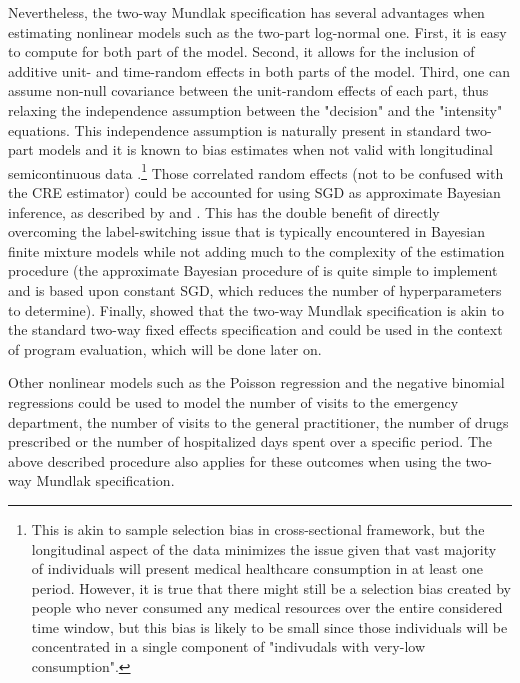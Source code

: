 \documentclass[11pt,letter]{article}
\begin{document}
Nevertheless, the two-way Mundlak specification has several advantages when estimating nonlinear models such as the two-part log-normal one. First, it is easy to compute for both part of the model. Second, it allows for the inclusion of additive unit- and time-random effects in both parts of the model. Third, one can assume non-null covariance between the unit-random effects of each part, thus relaxing the independence assumption between the "decision" and the "intensity" equations. This independence assumption is naturally present in standard two-part models and it is known to bias estimates when not valid with longitudinal semicontinuous data \citep{su_bias_2009,olsen_two-part_2001}.\footnote{This is akin to sample selection bias in cross-sectional framework, but the longitudinal aspect of the data minimizes the issue given that vast majority of individuals will present medical healthcare consumption in at least one period. However, it is true that there might still be a selection bias created by people who never consumed any medical resources over the entire considered time window, but this bias is likely to be small since those individuals will be concentrated in a single component of "indivudals with very-low consumption".} Those correlated random effects (not to be confused with the CRE estimator) could be accounted for using SGD as approximate Bayesian inference, as described by \cite{mandt_stochastic_2018} and \cite{smith_bayesian_2018}. This has the double benefit of directly overcoming the label-switching issue that is typically encountered in Bayesian finite mixture models \citep{fruhwirth-schnatter_finite_2006,jasra_markov_2005} while not adding much to the complexity of the estimation procedure (the approximate Bayesian procedure of \cite{mandt_stochastic_2018} is quite simple to implement and is based upon constant SGD, which reduces the number of hyperparameters to determine). Finally, \cite{wooldridge_two-way_2021} showed that the two-way Mundlak specification is akin to the standard two-way fixed effects specification and could be used in the context of program evaluation, which will be done later on.
\par
Other nonlinear models such as the Poisson regression and the negative binomial regressions could be used to model the number of visits to the emergency department, the number of visits to the general practitioner, the number of drugs prescribed or the number of hospitalized days spent over a specific period. The above described procedure also applies for these outcomes when using the two-way Mundlak specification.
\end{document}
